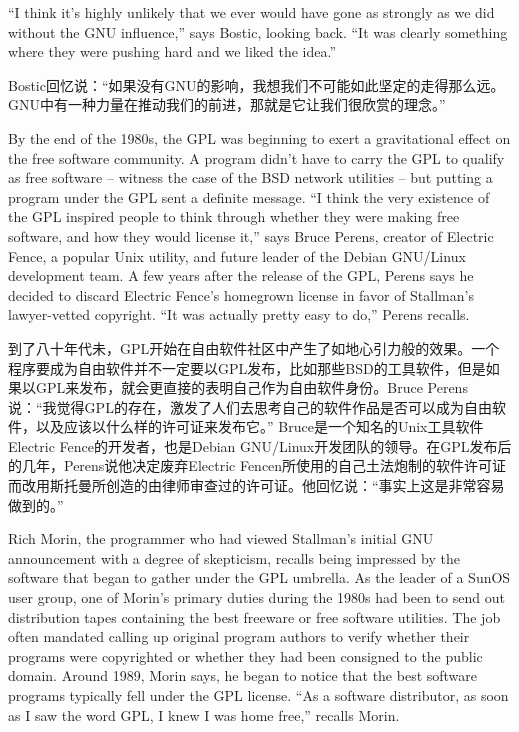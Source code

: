 \ifdefined\eng
``I think it's highly unlikely that we ever would have gone as strongly as we did without the GNU influence,'' says Bostic, looking back. ``It was clearly something where they were pushing hard and we liked the idea.''
\fi

\ifdefined\chs
Bostic回忆说：``如果没有GNU的影响，我想我们不可能如此坚定的走得那么远。GNU中有一种力量在推动我们的前进，那就是它让我们很欣赏的理念。''
\fi

\ifdefined\eng
By the end of the 1980s, the GPL was beginning to exert a gravitational effect on the free software community. A program didn't have to carry the GPL to qualify as free software -- witness the case of the BSD network utilities -- but putting a program under the GPL sent a definite message. ``I think the very existence of the GPL inspired people to think through whether they were making free software, and how they would license it,'' says Bruce Perens, creator of Electric Fence, a popular Unix utility, and future leader of the Debian GNU/Linux development team. A few years after the release of the GPL, Perens says he decided to discard Electric Fence's homegrown license in favor of Stallman's lawyer-vetted copyright. ``It was actually pretty easy to do,'' Perens recalls.
\fi

\ifdefined\chs
到了八十年代未，GPL开始在自由软件社区中产生了如地心引力般的效果。一个程序要成为自由软件并不一定要以GPL发布，比如那些BSD的工具软件，但是如果以GPL来发布，就会更直接的表明自己作为自由软件身份。Bruce Perens说：``我觉得GPL的存在，激发了人们去思考自己的软件作品是否可以成为自由软件，以及应该以什么样的许可证来发布它。'' Bruce是一个知名的Unix工具软件Electric Fence的开发者，也是Debian GNU/Linux开发团队的领导。在GPL发布后的几年，Perens说他决定废弃Electric Fencen所使用的自己土法炮制的软件许可证而改用斯托曼所创造的由律师审查过的许可证。他回忆说：``事实上这是非常容易做到的。''
\fi

\ifdefined\eng
Rich Morin, the programmer who had viewed Stallman's initial GNU announcement with a degree of skepticism, recalls being impressed by the software that began to gather under the GPL umbrella. As the leader of a SunOS user group, one of Morin's primary duties during the 1980s had been to send out distribution tapes containing the best freeware or free software utilities. The job often mandated calling up original program authors to verify whether their programs were copyrighted or whether they had been consigned to the public domain. Around 1989, Morin says, he began to notice that the best software programs typically fell under the GPL license. ``As a software distributor, as soon as I saw the word GPL, I knew I was home free,'' recalls Morin.
\fi

